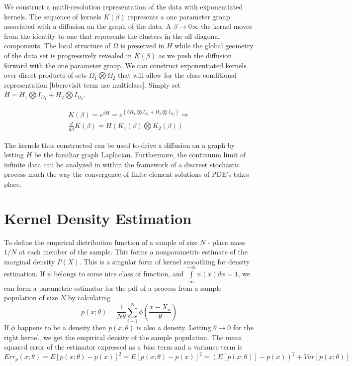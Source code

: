 We construct a mutli-resolution representation of the data with exponentiated kernels.  The sequence of kernels $K(\beta)$ represents a one parameter group associated with a diffusion on the graph of the data.  A $\beta \rightarrow  0 \infty$ the kernel moves from the identity to one that represents the clusters in the off diagonal components.  The local structure of $\Omega$ is preserved in $H$ while the global geometry of the data set is progressively revealed in $K(\beta)$ as we push the diffusion forward with the one parameter group.  We can construct exponentiated kernels over direct products of sets $\Omega_1 \bigotimes \Omega_2$ that will allow for the class conditional representation [bbcrevisit term use multiclass].  Simply set $H = H_1 \bigotimes I_{\Omega_1} +  H_2 \bigotimes I_{\Omega_2}$.
\begin{center}\begin{eqnarray*}
K(\beta) = e^{\beta H} =  e^{(\beta H_1 \bigotimes I_{\Omega_1} +  H_2 \bigotimes I_{\Omega_2})} \Rightarrow \\
\frac{d}{d \beta} K(\beta) =  H (K_1(\beta) \bigotimes K_2(\beta))
\end{eqnarray*}\end{center}

The kernels thus  constructed can be used to drive a diffusion on a graph by letting $H$ be the familiar graph Laplacian.  Furthermore, the continuum limit of infinite data can be analyzed in within the framework of a discreet stochastic process much the way the convergence of finite element solutions of PDE's takes place.


\section*{Kernel Density Estimation}
To define the empirical distribution function of a sample of size $N$ - place mass $1/N$ at each member of the sample.  This forms a nonparametric estimate of the marginal density $P(X)$.  This is a singular form of kernel smoothing for density estimation.  If $\psi$ belongs to some nice class of function, and $\int\limits_{\infty}^{-\infty}\psi(x) dx = 1$, we can form a parametric estimator for the pdf of a process from a sample
population of size $N$ by calculating
\begin{equation*} p(x;\theta)=\frac{1}{N \theta}
\sum\limits_{i-1}^{N} \phi( \frac{x-X_n}{\theta})
\end{equation*}
If $\phi$ happens to be a density then $p(x,\theta)$ is also a density.  Letting $\theta \rightarrow 0$ for the right kernel, we get the empirical density of the sample population.  The mean squared error of the estimator expressed as a bias term and a variance term is
\begin{equation*} Err_p(x;\theta)= E[p(x;\theta)-p(x)]^2 =  E[ p(x;\theta)-p(x)]^2 =
(E[p(x;\theta)]-p(x))^2 + Var[ p(x;\theta)]
\end{equation*}


